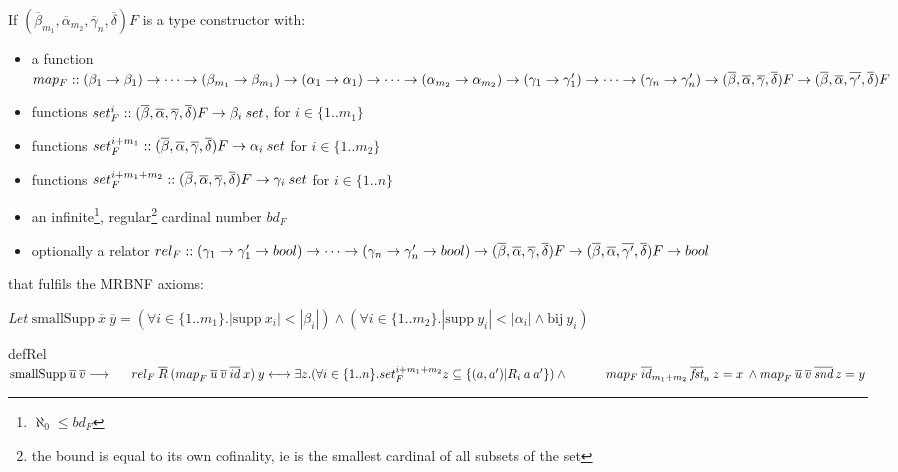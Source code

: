 \begin{definition}[\ac{MRBNF}]
If $(\overline{\beta}_{m_1}, \overline{\alpha}_{m_2}, \overline{\gamma}_n, \overline{\delta}) F$ is a type constructor with:
\begin{itemize}
\item{a function $map_F :: (\beta_1 \to \beta_1) \to \dots \to (\beta_{m_1} \to \beta_{m_1}) \to (\alpha_1 \to \alpha_1) \to \dots \to (\alpha_{m_2} \to \alpha_{m_2}) \to (\gamma_1 \to \gamma'_1) \to \dots \to (\gamma_n \to \gamma'_n) \to (\overline{\beta}, \overline{\alpha}, \overline{\gamma}, \overline{\delta}) F \to (\overline{\beta}, \overline{\alpha}, \overline{\gamma'}, \overline{\delta}) F$}
\item{functions $set_F^i :: (\overline{\beta}, \overline{\alpha}, \overline{\gamma}, \overline{\delta}) F \to \beta_i \: set$, for $i \in \{1 .. m_1\}$}
\item{functions $set_F^{i+m_1} :: (\overline{\beta}, \overline{\alpha}, \overline{\gamma}, \overline{\delta}) F \to \alpha_i \: set$ for $i \in \{1 .. m_2\}$}
\item{functions $set_F^{i+m_1+m_2} :: (\overline{\beta}, \overline{\alpha}, \overline{\gamma}, \overline{\delta}) F \to \gamma_i \: set$ for $i \in \{1 .. n\}$}
\item{an infinite\footnote{$\aleph_0 \le bd_F$}, regular\footnote{the bound is equal to its own cofinality, ie is the smallest cardinal of all subsets of the set\label{ftn:regular}} cardinal number $bd_F$}
\item{optionally a relator $rel_F :: (\gamma_1 \to \gamma'_1 \to bool) \to \dots \to (\gamma_n \to \gamma'_n \to bool) \to (\overline{\beta}, \overline{\alpha}, \overline{\gamma}, \overline{\delta}) F \to (\overline{\beta}, \overline{\alpha}, \overline{\gamma'}, \overline{\delta}) F \to bool$}
\end{itemize}

that fulfils the \ac{MRBNF} axioms:
\vspace{1em}

\textit{Let} $\text{smallSupp} \: \overline{x} \: \overline{y} = (\forall i \in \{1..m_1\}. |\text{supp} \: x_i| < |\beta_i|) \wedge (\forall i \in \{1..m_2\}. |\text{supp} \: y_i| < |\alpha_i| \wedge \text{bij} \: y_i)$

\newcommand{\mapF}[3]{\map{F}{#1}{#2}{#3}}
\newcommand{\relF}[3]{rel_F \: \overline{#1} \: \overline{#2} \: \overline{#3}}

\begin{axiom}{defRel}\label{ax:def_rel}
$\smallSupp{u}{v} \longrightarrow \\
\ms rel_F \: \overline{R} \: (\map{F}{u}{v}{id} \: x) \: y \longleftrightarrow \exists z. (\forall i \in \{1..n\}. set_F^{i+m_1+m_2} z \subseteq \{(a, a') | R_i \: a \: a' \}) \wedge \\*
\ms \ms map_F \: \overline{id}_{m_1+m_2} \: \overline{\textit{fst}}_n \: z = x \: \wedge \mapF{u}{v}{\textit{snd}} \: z = y
$
\end{axiom}


\end{definition}
